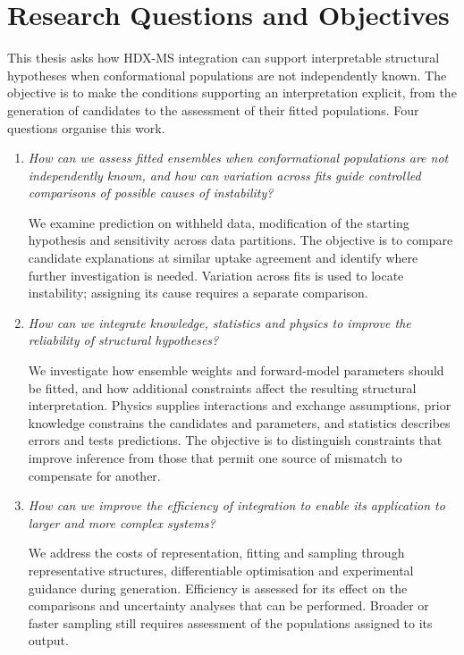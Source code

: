 \section{Research Questions and Objectives}
\label{sec:intro-questions}

This thesis asks how HDX-MS integration can support interpretable structural hypotheses when conformational populations are not independently known. The objective is to make the conditions supporting an interpretation explicit, from the generation of candidates to the assessment of their fitted populations. Four questions organise this work.

\begin{enumerate}
    \item \textit{How can we assess fitted ensembles when conformational populations are not independently known, and how can variation across fits guide controlled comparisons of possible causes of instability?}

    We examine prediction on withheld data, modification of the starting hypothesis and sensitivity across data partitions. The objective is to compare candidate explanations at similar uptake agreement and identify where further investigation is needed. Variation across fits is used to locate instability; assigning its cause requires a separate comparison.

    \item \textit{How can we integrate knowledge, statistics and physics to improve the reliability of structural hypotheses?}

    We investigate how ensemble weights and forward-model parameters should be fitted, and how additional constraints affect the resulting structural interpretation. Physics supplies interactions and exchange assumptions, prior knowledge constrains the candidates and parameters, and statistics describes errors and tests predictions. The objective is to distinguish constraints that improve inference from those that permit one source of mismatch to compensate for another.

    \item \textit{How can we improve the efficiency of integration to enable its application to larger and more complex systems?}

    We address the costs of representation, fitting and sampling through representative structures, differentiable optimisation and experimental guidance during generation. Efficiency is assessed for its effect on the comparisons and uncertainty analyses that can be performed. Broader or faster sampling still requires assessment of the populations assigned to its output.


\end{enumerate}
